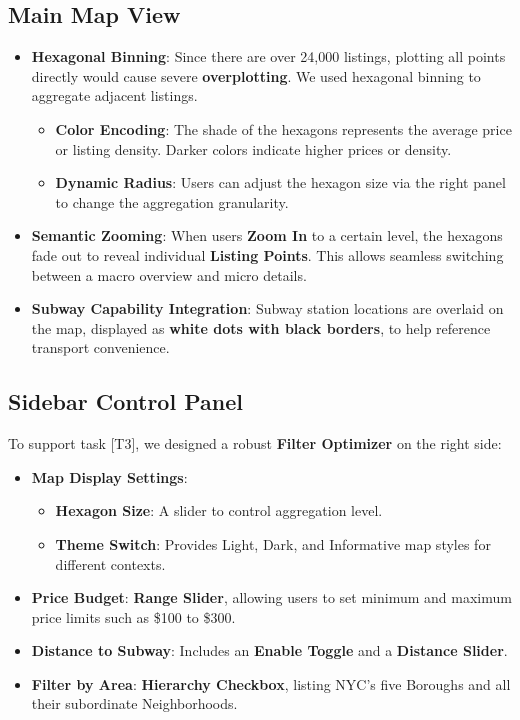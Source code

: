\documentclass[journal, a4paper]{IEEEtran}
\begin{document}
\subsection{Main Map View}
\begin{itemize}
    \item \textbf{Hexagonal Binning}:
    Since there are over 24,000 listings, plotting all points directly would cause severe \textbf{overplotting}. We used hexagonal binning to aggregate adjacent listings.
    \begin{itemize}
        \item \textbf{Color Encoding}: The shade of the hexagons represents the average price or listing density. Darker colors indicate higher prices or density.
        \item \textbf{Dynamic Radius}: Users can adjust the hexagon size via the right panel to change the aggregation granularity.
    \end{itemize}
    \item \textbf{Semantic Zooming}:
    When users \textbf{Zoom In} to a certain level, the hexagons fade out to reveal individual \textbf{Listing Points}. This allows seamless switching between a macro overview and micro details.
    \item \textbf{Subway Capability Integration}:
    Subway station locations are overlaid on the map, displayed as \textbf{white dots with black borders}, to help reference transport convenience.
\end{itemize}



\subsection{Sidebar Control Panel}
To support task [T3], we designed a robust \textbf{Filter Optimizer} on the right side:
\begin{itemize}
    \item \textbf{Map Display Settings}:
    \begin{itemize}
        \item \textbf{Hexagon Size}: A slider to control aggregation level.
        \item \textbf{Theme Switch}: Provides Light, Dark, and Informative map styles for different contexts.
    \end{itemize}
    \item \textbf{Price Budget}:
    \textbf{Range Slider}, allowing users to set minimum and maximum price limits such as \$100 to \$300.
    \item \textbf{Distance to Subway}:
    Includes an \textbf{Enable Toggle} and a \textbf{Distance Slider}.
    \item \textbf{Filter by Area}:
    \textbf{Hierarchy Checkbox}, listing NYC's five Boroughs and all their subordinate Neighborhoods.
\end{itemize}
\end{document}
